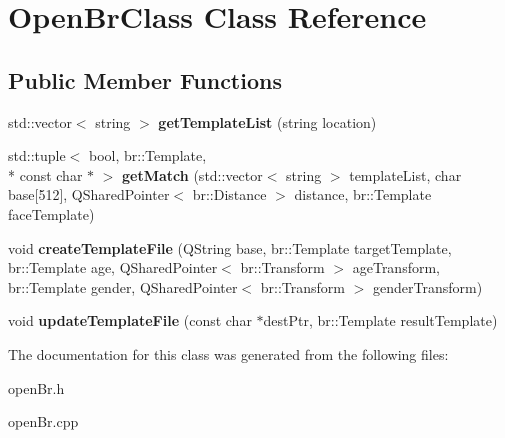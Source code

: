 \hypertarget{classOpenBrClass}{\section{Open\-Br\-Class Class Reference}
\label{classOpenBrClass}
}
\subsection*{Public Member Functions}
\begin{DoxyCompactItemize}
\item 
\hypertarget{classOpenBrClass_ae18e0b56054eac7b89125246ee19f4df}{std\-::vector$<$ string $>$ {\bfseries get\-Template\-List} (string location)}\label{classOpenBrClass_ae18e0b56054eac7b89125246ee19f4df}

\item 
\hypertarget{classOpenBrClass_ac715370d352d86eda52ea8cf9e66250e}{std\-::tuple$<$ bool, br\-::\-Template, \\*
const char $\ast$ $>$ {\bfseries get\-Match} (std\-::vector$<$ string $>$ template\-List, char base\mbox{[}512\mbox{]}, Q\-Shared\-Pointer$<$ br\-::\-Distance $>$ distance, br\-::\-Template face\-Template)}\label{classOpenBrClass_ac715370d352d86eda52ea8cf9e66250e}

\item 
\hypertarget{classOpenBrClass_a8b762954fb71e02955da4a66f1f8d375}{void {\bfseries create\-Template\-File} (Q\-String base, br\-::\-Template target\-Template, br\-::\-Template age, Q\-Shared\-Pointer$<$ br\-::\-Transform $>$ age\-Transform, br\-::\-Template gender, Q\-Shared\-Pointer$<$ br\-::\-Transform $>$ gender\-Transform)}\label{classOpenBrClass_a8b762954fb71e02955da4a66f1f8d375}

\item 
\hypertarget{classOpenBrClass_a2684c33bd2286dca865fc4ba02379b7a}{void {\bfseries update\-Template\-File} (const char $\ast$dest\-Ptr, br\-::\-Template result\-Template)}\label{classOpenBrClass_a2684c33bd2286dca865fc4ba02379b7a}

\end{DoxyCompactItemize}


The documentation for this class was generated from the following files\-:\begin{DoxyCompactItemize}
\item 
open\-Br.\-h\item 
open\-Br.\-cpp\end{DoxyCompactItemize}
